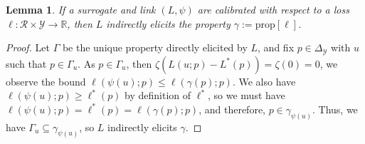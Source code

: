 \documentclass{article}
\newcommand{\reals}{\mathbb{R}}
\newcommand{\simplex}{\Delta_\Y}
\newcommand{\prop}[1]{\mathrm{prop}[#1]}
\newcommand{\R}{\mathcal{R}}
\newcommand{\Y}{\mathcal{Y}}
\newcommand{\risk}[1]{#1^*}
\newtheorem{lemma}{Lemma}
\begin{document}
\begin{lemma}\label{lem:calib-implies-indir}
	If a surrogate and link $(L, \psi)$ are calibrated with respect to a loss $\ell:\R \times\Y \to \reals$, then $L$ indirectly elicits the property $\gamma := \prop{\ell}$.
\end{lemma}
\begin{proof}
	Let $\Gamma$ be the unique property directly elicited by $L$, and fix $p \in \simplex$ with $u$ such that $p \in \Gamma_u$.
	As $p \in \Gamma_u$, then $\zeta(L(u;p) - \risk{L}(p)) = \zeta(0) = 0$, we observe the bound $\ell(\psi(u); p) \leq \ell(\gamma(p); p)$.
	We also have $\ell(\psi(u); p) \geq \risk{\ell}(p)$ by definition of $\risk{\ell}$, so we must have $\ell(\psi(u);p) = \risk{\ell}(p) = \ell(\gamma(p); p)$, and therefore, $p \in \gamma_{\psi(u)}$.
	Thus, we have $\Gamma_u \subseteq \gamma_{\psi(u)}$, so $L$ indirectly elicits $\gamma$.
\end{proof}
\end{document}
